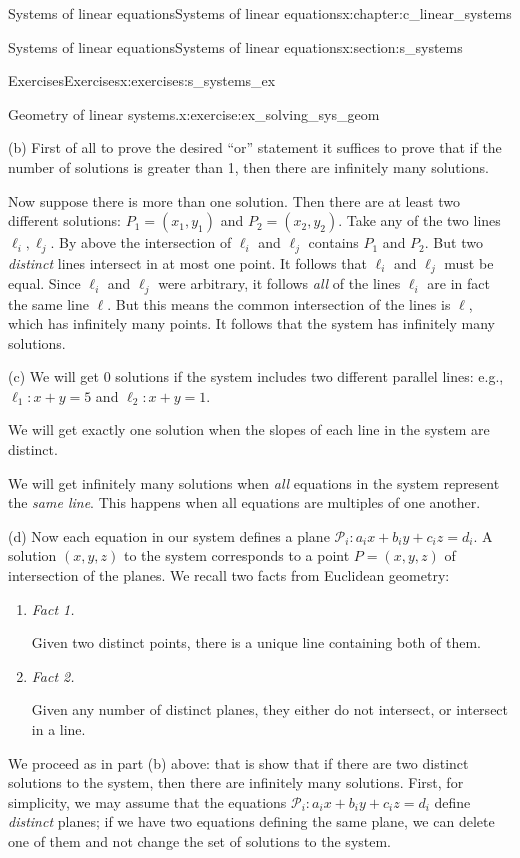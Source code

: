 \documentclass[oneside,10pt,]{book}
\newcommand{\lititle}[1]{{\slshape#1}}
\numberwithin{equation}{section}
\begin{document}
\begin{chapterptx}{Systems of linear equations}{}{Systems of linear equations}{}{}{x:chapter:c_linear_systems}
\begin{sectionptx}{Systems of linear equations}{}{Systems of linear equations}{}{}{x:section:s_systems}
\begin{exercises-subsection-numberless}{Exercises}{}{Exercises}{}{}{x:exercises:s_systems_ex}
\begin{divisionexercise}{1}{Geometry of linear systems.}{}{x:exercise:ex_solving_sys_geom}
\par
(b) First of all to prove the desired ``or'' statement it suffices to prove that if the number of solutions is greater than 1, then there are infinitely many solutions.%
\par
Now suppose there is more than one solution. Then there are at least two different solutions: \(P_1=(x_1,y_1)\) and \(P_2=(x_2,y_2)\). Take any of the two lines \(\ell_i, \ell_j\). By above the intersection of \(\ell_i\) and \(\ell_j\) contains \(P_1\) and \(P_2\). But two \emph{distinct} lines intersect in at most one point. It follows that \(\ell_i\) and \(\ell_j\) must be equal. Since \(\ell_i\) and \(\ell_j\) were arbitrary, it follows \emph{all} of the lines \(\ell_i\) are in fact the same line \(\ell\). But this means the common intersection of the lines is \(\ell\), which has infinitely many points. It follows that the system has infinitely many solutions.%
\par
(c) We will get 0 solutions if the system includes two different parallel lines: e.g., \(\ell_1\colon x+y=5\) and \(\ell_2\colon x+y=1\).%
\par
We will get exactly one solution when the slopes of each line in the system are distinct.%
\par
We will get infinitely many solutions when \emph{all} equations in the system represent the \emph{same line}. This happens when all equations are multiples of one another.%
\par
(d) Now each equation in our system defines a plane \(\mathcal{P}_i\colon a_ix+b_iy+c_iz=d_i\). A solution \((x,y,z)\) to the system corresponds to a point \(P=(x,y,z)\) of intersection of the planes. We recall two facts from Euclidean geometry:%
\begin{enumerate}[marker=(\alph*)]
\item{}\lititle{Fact 1.}\par%
Given two distinct points, there is a unique line containing both of them.%
\item{}\lititle{Fact 2.}\par%
Given any number of distinct planes, they either do not intersect, or intersect in a line.%
\end{enumerate}
%
\par
We proceed as in part (b) above: that is show that if there are two distinct solutions to the system, then there are infinitely many solutions. First, for simplicity, we may assume that the equations \(\mathcal{P}_i\colon a_ix+b_iy+c_iz=d_i\) define \emph{distinct} planes; if we have two equations defining the same plane, we can delete one of them and not change the set of solutions to the system.%

\end{divisionexercise}
\end{exercises-subsection-numberless}
\end{sectionptx}
\end{chapterptx}
\end{document}
